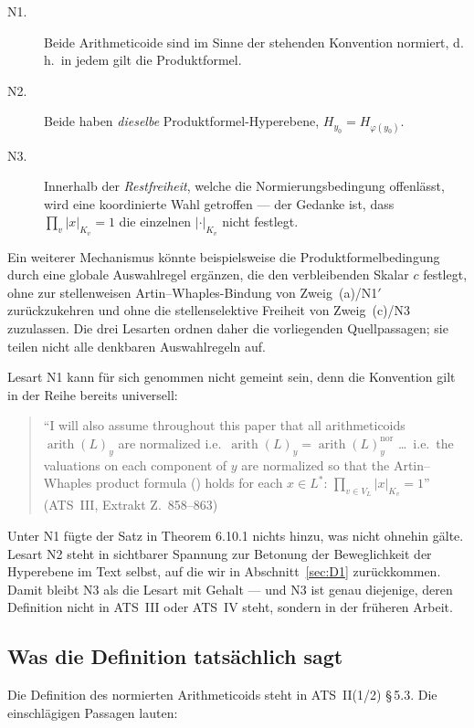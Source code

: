 \documentclass[11pt,a4paper]{article}
\theoremstyle{definition}
\theoremstyle{plain}
\theoremstyle{definition}
\newcommand{\arith}{\operatorname{arith}}
\newcommand{\anchor}[2]{(#1, Extrakt Z.~#2)}
\begin{document}
\begin{description}
\item[N1.] Beide Arithmeticoide sind im Sinne der stehenden Konvention normiert,
  d.\,h.\ in jedem gilt die Produktformel.
\item[N2.] Beide haben \emph{dieselbe} Produktformel-Hyperebene,
  $H_{y_0} = H_{\varphi(y_0)}$.
\item[N3.] Innerhalb der \emph{Restfreiheit}, welche die Normierungsbedingung
  offenlässt, wird eine koordinierte Wahl getroffen --- der Gedanke ist, dass
  $\prod_v |x|_{K_v} = 1$ die einzelnen $|\cdot|_{K_v}$ nicht festlegt.
\end{description}

Ein weiterer Mechanismus könnte beispielsweise die Produktformelbedingung durch
eine globale Auswahlregel ergänzen, die den verbleibenden Skalar $c$ festlegt,
ohne zur stellenweisen Artin--Whaples-Bindung von Zweig~(a)/N1$'$ zurückzukehren
und ohne die stellenselektive Freiheit von Zweig~(c)/N3 zuzulassen. Die drei
Lesarten ordnen daher die
vorliegenden Quellpassagen; sie teilen nicht alle denkbaren Auswahlregeln auf.

Lesart N1 kann für sich genommen nicht gemeint sein, denn die Konvention gilt in
der Reihe bereits universell:

\begin{quote}\small
``I will also assume throughout this paper that all arithmeticoids $\arith(L)_y$
are normalized i.e.\ $\arith(L)_y = \arith(L)^{\mathrm{nor}}_y$ \ldots\ i.e.\ the
valuations on each component of $y$ are normalized so that the Artin--Whaples
product formula (\cite{ArtinWhaples1945}) holds for each $x \in L^*$:
$\prod_{v \in V_L} |x|_{K_v} = 1$'' \hfill\anchor{ATS~III}{858--863}
\end{quote}

Unter N1 fügte der Satz in Theorem 6.10.1 nichts hinzu, was nicht ohnehin gälte.
Lesart N2 steht in sichtbarer Spannung zur Betonung der Beweglichkeit der
Hyperebene im Text selbst, auf die wir in Abschnitt~\ref{sec:D1} zurückkommen. Damit
bleibt N3 als die Lesart mit Gehalt --- und N3 ist genau diejenige, deren Definition
nicht in ATS~III oder ATS~IV steht, sondern in der früheren Arbeit.

\subsection{Was die Definition tatsächlich sagt}

Die Definition des normierten Arithmeticoids steht in ATS~II(1/2) \S\,5.3. Die
einschlägigen Passagen lauten:
\end{document}
